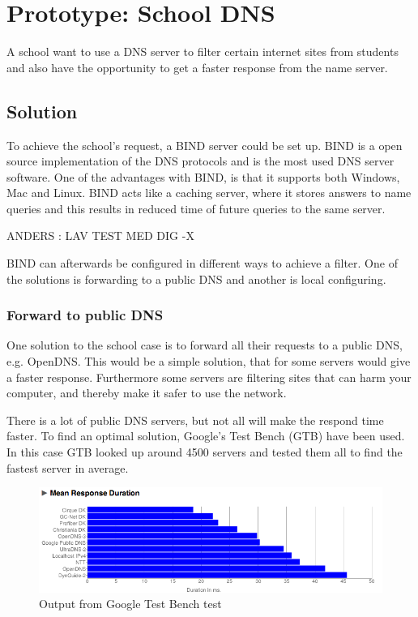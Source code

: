 \documentclass[Preamble]{subfiles}
\begin{document}
\chapter{Prototype: School DNS}
A school want to use a DNS server to filter certain internet sites from students and also have the opportunity to get a faster response from the name server. 

\section{Solution}
To achieve the school's request, a BIND server could be set up. BIND is a open source implementation of the DNS protocols and is the most used DNS server software. One of the advantages with BIND, is that it supports both Windows, Mac and Linux. BIND acts like a caching server, where it stores answers to name queries and this results in reduced time of future queries to the same server.

ANDERS : LAV TEST MED DIG -X

BIND can afterwards be configured in different ways to achieve a filter. One of the solutions is forwarding to a public DNS and another is local configuring.

\subsection{Forward to public DNS}

One solution to the school case is to forward all their requests to a public DNS, e.g. OpenDNS. This would be a simple solution, that for some servers would give a faster response. Furthermore some servers are filtering sites that can harm your computer, and thereby make it safer to use the network.

There is a lot of public DNS servers, but not all will make the respond time faster. To find  an optimal solution, Google's Test Bench (GTB) have been used. In this case GTB looked up around 4500 servers and tested them all to find the fastest server in average.

\begin{figure}[hbtp]
\centering
\includegraphics[scale=0.5]{Figurer/NamebenchTest.png}
\caption{Output from Google Test Bench test}
\end{figure}
\end{document}
